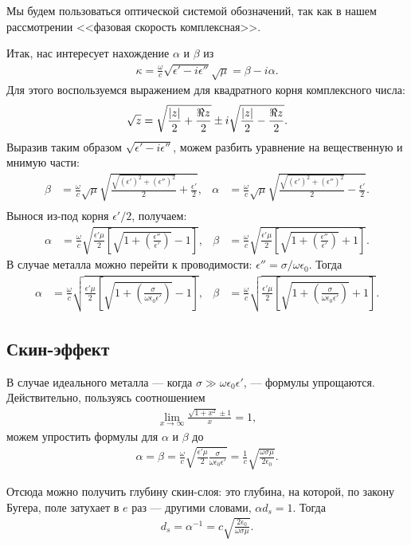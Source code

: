 Мы будем пользоваться оптической системой обозначений, так как в нашем
рассмотрении <<фазовая скорость комплексная>>.

Итак, нас интересует нахождение \(\alpha\) и \(\beta\) из
\begin{align*}
  \kappa = \frac{\omega}{c}\sqrt{\epsilon' - i\epsilon''}\sqrt{\mu} = \beta - i\alpha.
\end{align*}
Для этого воспользуемся выражением для квадратного корня комплексного числа:
\begin{align*}
  \sqrt{z} = \sqrt{\frac{\left\lvert z \right\rvert}{2} + \frac{\Re{z}}{2}} \pm
  i\sqrt{\frac{\left\lvert z \right\rvert}{2} - \frac{\Re{z}}{2}}.
\end{align*}
Выразив таким образом \(\sqrt{\epsilon' - i\epsilon''}\), можем разбить
уравнение на вещественную и мнимую части:
\begin{align*}
  \beta &= \frac{\omega}{c}\sqrt{\mu}\sqrt{\frac{\sqrt{(\epsilon')^2 + (\epsilon'')^2}}{2} + \frac{\epsilon'}{2}}, &
  \alpha &= \frac{\omega}{c}\sqrt{\mu}\sqrt{\frac{\sqrt{(\epsilon')^2 + (\epsilon'')^2}}{2} - \frac{\epsilon'}{2}}. \\
\end{align*}
Вынося из-под корня \(\epsilon'/2\), получаем:
\begin{align*}
  \alpha &= \frac{\omega}{c}\sqrt{\frac{\epsilon'\mu}{2}\left[\sqrt{1
  + \left(\frac{\epsilon''}{\epsilon'}\right)} - 1\right]}, &
  \beta &= \frac{\omega}{c}\sqrt{\frac{\epsilon'\mu}{2}\left[\sqrt{1
  + \left(\frac{\epsilon''}{\epsilon'}\right)} + 1\right]}.
\end{align*}
В случае металла можно перейти к проводимости: \(\epsilon''
= \sigma/\omega\epsilon_0\).
Тогда 
\begin{align*}
  \alpha &= \frac{\omega}{c}\sqrt{\frac{\epsilon'\mu}{2}\left[\sqrt{1
  + \left(\frac{\sigma}{\omega\epsilon_0\epsilon'}\right)} - 1\right]}, &
  \beta &= \frac{\omega}{c}\sqrt{\frac{\epsilon'\mu}{2}\left[\sqrt{1
  + \left(\frac{\sigma}{\omega\epsilon_0\epsilon'}\right)} + 1\right]}.
\end{align*}

\subsection{Скин-эффект}
В случае идеального металла --- когда \(\sigma \gg \omega\epsilon_0\epsilon'\), ---
формулы упрощаются. Действительно, пользуясь соотношением
\begin{align*}
  \lim\limits_{x \to \infty} \frac{\sqrt{1 + x^2} \pm 1}{x} = 1,
\end{align*}
можем упростить формулы для \(\alpha\) и \(\beta\) до
\begin{align*}
  \alpha = \beta
  = \frac{\omega}{c}\sqrt{\frac{\epsilon'\mu}{2}\frac{\sigma}{\omega\epsilon_0\epsilon'}}
  = \frac{1}{c}\sqrt{\frac{\omega\sigma\mu}{2\epsilon_0}}.
\end{align*}

Отсюда можно получить глубину скин-слоя: это глубина, на которой, по закону
Бугера, поле затухает в \(e\) раз --- другими словами, \(\alpha d_s = 1\).
Тогда
\begin{align*}
  d_s = \alpha^{-1} = c\sqrt{\frac{2\epsilon_0}{\omega\sigma\mu}}.
\end{align*}

